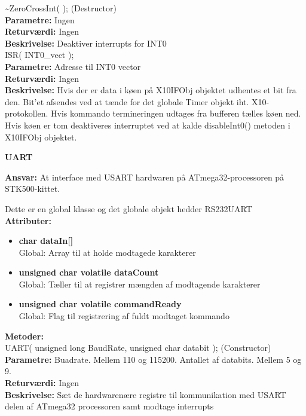 \textasciitilde ZeroCrossInt( ); (Destructor) \\
\textbf{Parametre:} Ingen \\
\textbf{Returværdi:} Ingen \\
\textbf{Beskrivelse:} Deaktiver interrupts for INT0 \\

ISR( INT0\_vect ); \\
\textbf{Parametre:} Adresse til INT0 vector \\
\textbf{Returværdi:} Ingen \\
\textbf{Beskrivelse:} Hvis der er data i køen på X10IFObj objektet udhentes et bit fra den. Bit'et afsendes ved at tænde for det globale Timer objekt iht. X10-protokollen. Hvis kommando termineringen udtages fra bufferen tælles køen ned. Hvis køen er tom deaktiveres interruptet ved at kalde disableInt0() metoden i X10IFObj objektet. \\

%
%
{\centering
\textbf{UART}\par
}
\textbf{Ansvar:} At interface med USART hardwaren på ATmega32-processoren på STK500-kittet.

Dette er en global klasse og det globale objekt hedder RS232UART \\
\textbf{Attributer:}
\begin{itemize}
	\item \textbf{char dataIn[]} \\
	Global: Array til at holde modtagede karakterer
	\item \textbf{unsigned char volatile dataCount} \\
	Global: Tæller til at registrer mængden af modtagende karakterer
	\item \textbf{unsigned char volatile commandReady} \\
	Global: Flag til registrering af fuldt modtaget kommando
\end{itemize}
\textbf{Metoder:} \\
UART( unsigned long BaudRate, unsigned char databit ); (Constructor) \\
\textbf{Parametre:} Buadrate. Mellem 110 og 115200. Antallet af databits. Mellem 5 og 9. \\
\textbf{Returværdi:} Ingen \\
\textbf{Beskrivelse:} Sæt de hardwarenære registre til kommunikation med USART delen af ATmega32 processoren samt modtage interrupts \\

